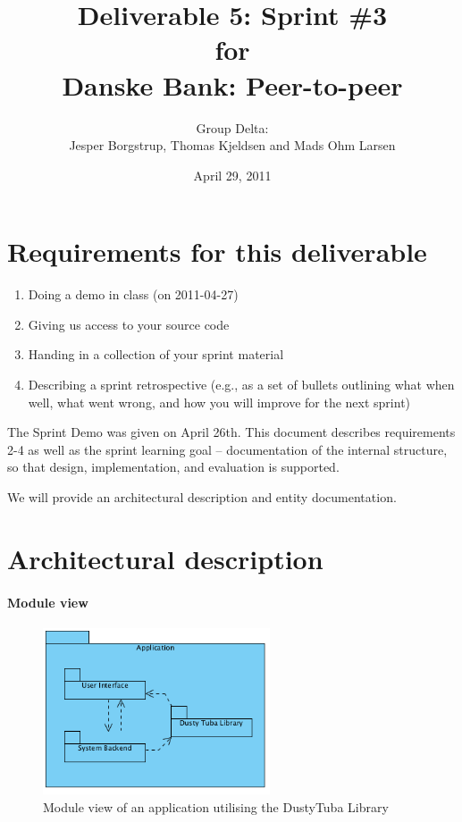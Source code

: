 \documentclass[a4paper,11pt]{article}
\title{Deliverable 5: Sprint \#3\\\small{for}\\\small{Danske Bank: Peer-to-peer}}
\author{ Group Delta:\\Jesper Borgstrup, Thomas Kjeldsen and Mads Ohm Larsen }
\date{April 29, 2011}
\begin{document}
\ifpdf
{}
\else
{}
\fi

\maketitle



\section{Requirements for this deliverable}
\begin{enumerate}
\item Doing a demo in class (on 2011-04-27)
\item Giving us access to your source code
\item Handing in a collection of your sprint material
\item Describing a sprint retrospective (e.g., as a set of bullets outlining what
when well, what went wrong, and how you will improve for the next sprint)
\end{enumerate}

The Sprint Demo was given on April 26th. This document describes requirements 2-4 as well as the sprint learning goal -- documentation of the internal structure, so that design, implementation, and evaluation is supported.

We will provide an architectural description and entity documentation.


\section{Architectural description}

\paragraph{Module view}
\begin{figure}[ht!]
	\begin{center}
	\includegraphics[width=0.6\textwidth]{ApplicationModuleView.PNG}		
	\end{center}
	\caption{Module view of an application utilising the DustyTuba Library}
	\label{amw}
\end{figure}
\end{document}
